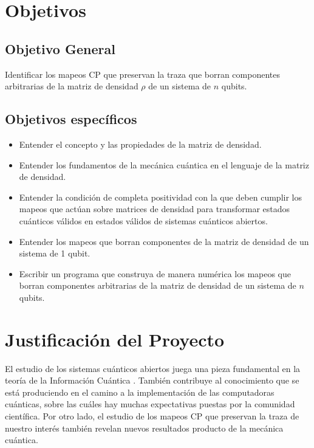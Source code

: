 \documentclass[11pt, spanish, letterpage]{article} %
\begin{document}

\section{Objetivos}
\subsection{Objetivo General}
Identificar los mapeos CP  que preservan la traza que borran
componentes arbitrarias de la matriz de densidad $\rho$ de un sistema de $n$
qubits. 	

\subsection{Objetivos específicos}
\begin{itemize}
\item Entender el concepto y las propiedades de la matriz de densidad.
\item Entender los fundamentos de la mecánica cuántica en el lenguaje de la
	  matriz de densidad.
\item Entender la condición de completa positividad con la que deben cumplir 
	  los mapeos que actúan sobre matrices de densidad para transformar estados
      cuánticos válidos en estados válidos de sistemas cuánticos abiertos.
\item Entender los mapeos que borran componentes de la matriz de densidad
	  de un sistema de 1 qubit.
\item Escribir un programa que construya de manera numérica los mapeos que
borran componentes arbitrarias de la matriz de densidad de un sistema de $n$
qubits.
\end{itemize}

\section{Justificación del Proyecto}%
El estudio de los sistemas cuánticos abiertos juega  una pieza fundamental en la teoría de la
Información Cuántica . También contribuye al conocimiento que se
está produciendo en el camino a la implementación de las computadoras
cuánticas, sobre las cuáles hay muchas expectativas puestas por la comunidad
científica. Por otro lado, el estudio de los mapeos CP que preservan la traza
de nuestro interés también revelan nuevos resultados producto de la mecánica
cuántica.   
\end{document}
